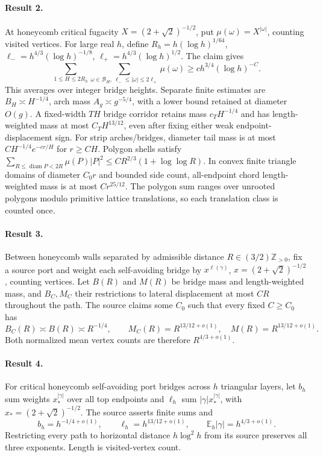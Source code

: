 \documentclass[11pt]{article}
\begin{document}
\paragraph{Result 2.} At honeycomb critical fugacity \(X=(2+\sqrt2)^{-1/2}\), put \(\mu(\omega)=X^{|\omega|}\), counting visited vertices. For large real \(h\), define \(R_h=h(\log h)^{1/64}\), \(\ell_-=h^{4/3}(\log h)^{-1/8}\), \(\ell_+=h^{4/3}(\log h)^{1/2}\). The claim gives
\[
 \sum_{1\le H\le2R_h}\sum_{\omega\in\mathcal B_H,\ \ell_-\le|\omega|\le2\ell_+}\mu(\omega)
 \ge c h^{3/4}(\log h)^{-C}.
\]
This averages over integer bridge heights. Separate finite estimates are \(B_H\asymp H^{-1/4}\), arch mass \(A_g\asymp g^{-5/4}\), with a lower bound retained at diameter \(O(g)\). A fixed-width \(TH\) bridge corridor retains mass \(c_TH^{-1/4}\) and has length-weighted mass at most \(C_TH^{13/12}\), even after fixing either weak endpoint-displacement sign. For strip arches/bridges, diameter tail mass is at most \(CH^{-1/4}e^{-cr/H}\) for \(r\ge CH\). Polygon shells satisfy \(\sum_{R\le\operatorname{diam}P<2R}\mu(P)|P|^2\le CR^{2/3}(1+\log\log R)\). In convex finite triangle domains of diameter \(C_0r\) and bounded side count, all-endpoint chord length-weighted mass is at most \(Cr^{25/12}\). The polygon sum ranges over unrooted polygons modulo primitive lattice translations, so each translation class is counted once.

\paragraph{Result 3.} Between honeycomb walls separated by admissible distance $R\in(3/2)\mathbb Z_{>0}$, fix a source port and weight each self-avoiding bridge by \(x^{\ell(\gamma)}\), \(x=(2+\sqrt2)^{-1/2}\), counting vertices. Let \(B(R)\) and \(M(R)\) be bridge mass and length-weighted mass, and \(B_C,M_C\) their restrictions to lateral displacement at most \(CR\) throughout the path. The source claims some \(C_0\) such that every fixed \(C\ge C_0\) has
\[
 B_C(R)\asymp B(R)\asymp R^{-1/4},\qquad
 M_C(R)=R^{13/12+o(1)},\quad M(R)=R^{13/12+o(1)}.
\]
Both normalized mean vertex counts are therefore \(R^{4/3+o(1)}\).

\paragraph{Result 4.} For critical honeycomb self-avoiding port bridges across \(h\) triangular layers, let \(b_h\) sum weights \(x_*^{|\gamma|}\) over all top endpoints and \(\ell_h\) sum \(|\gamma|x_*^{|\gamma|}\), with \(x_*=(2+\sqrt2)^{-1/2}\). The source asserts finite sums and
\[
 b_h=h^{-1/4+o(1)},\qquad\ell_h=h^{13/12+o(1)},\qquad
 \mathbb E_h|\gamma|=h^{4/3+o(1)}.
\]
Restricting every path to horizontal distance \(h\log^2h\) from its source preserves all three exponents. Length is visited-vertex count.
\end{document}
